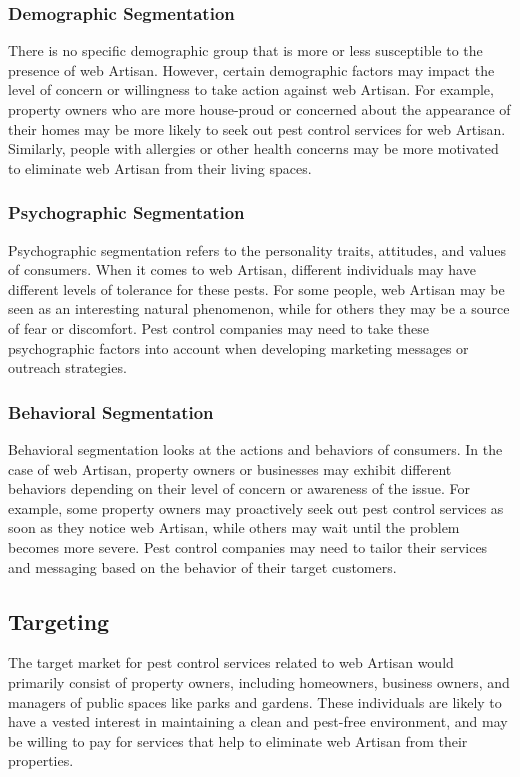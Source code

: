 \documentclass[12pt,a4paper]{article}
\begin{document}
\subsubsection{Demographic Segmentation}
There is no specific demographic group that is more or less susceptible to the presence of web Artisan. However, certain demographic factors may impact the level of concern or willingness to take action against web Artisan. For example, property owners who are more house-proud or concerned about the appearance of their homes may be more likely to seek out pest control services for web Artisan. Similarly, people with allergies or other health concerns may be more motivated to eliminate web Artisan from their living spaces.
\subsubsection{Psychographic Segmentation}
 Psychographic segmentation refers to the personality traits, attitudes, and values of consumers. When it comes to web Artisan, different individuals may have different levels of tolerance for these pests. For some people, web Artisan may be seen as an interesting natural phenomenon, while for others they may be a source of fear or discomfort. Pest control companies may need to take these psychographic factors into account when developing marketing messages or outreach strategies.
\subsubsection{Behavioral Segmentation}
Behavioral segmentation looks at the actions and behaviors of consumers. In the case of web Artisan, property owners or businesses may exhibit different behaviors depending on their level of concern or awareness of the issue. For example, some property owners may proactively seek out pest control services as soon as they notice web Artisan, while others may wait until the problem becomes more severe. Pest control companies may need to tailor their services and messaging based on the behavior of their target customers.
\subsection{Targeting}
The target market for pest control services related to web Artisan would primarily consist of property owners, including homeowners, business owners, and managers of public spaces like parks and gardens. These individuals are likely to have a vested interest in maintaining a clean and pest-free environment, and may be willing to pay for services that help to eliminate web Artisan from their properties.
\end{document}
